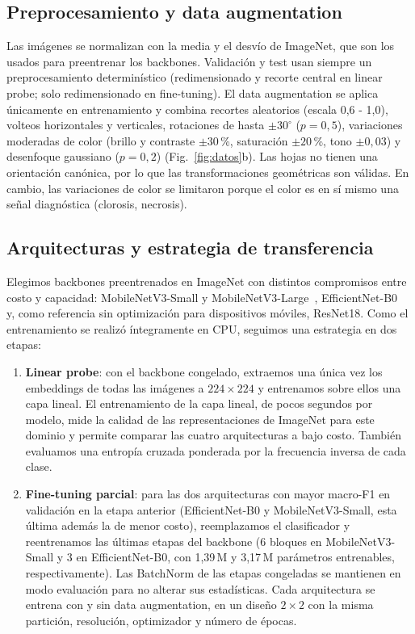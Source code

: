 \subsection{Preprocesamiento y data augmentation}
\label{subsec:augmentation}
Las imágenes se normalizan con la media y el desvío de ImageNet, que son los usados para
preentrenar los backbones. Validación y test usan siempre un preprocesamiento determinístico
(redimensionado y recorte central en linear probe; solo redimensionado en fine-tuning). El data augmentation se aplica únicamente en entrenamiento y combina
recortes aleatorios (escala 0,6 - 1,0), volteos horizontales y verticales, rotaciones de hasta
$\pm30^\circ$ ($p=0{,}5$), variaciones moderadas de color (brillo y contraste $\pm30$\,\%,
saturación $\pm20$\,\%, tono $\pm0{,}03$) y desenfoque gaussiano ($p=0{,}2$)
(Fig.~\ref{fig:datos}b). Las hojas no
tienen una orientación canónica, por lo que las transformaciones geométricas son válidas. En
cambio, las variaciones de color se limitaron porque el color es en sí mismo una señal
diagnóstica (clorosis, necrosis).

\subsection{Arquitecturas y estrategia de transferencia}
\label{subsec:arquitecturas}
Elegimos backbones preentrenados en ImageNet con distintos compromisos entre costo y
capacidad: MobileNetV3-Small y MobileNetV3-Large~\cite{howard2019searching},
EfficientNet-B0~\cite{tan2019efficientnet} y, como referencia sin optimización para
dispositivos móviles, ResNet18. Como el entrenamiento se realizó íntegramente en CPU, seguimos
una estrategia en dos etapas:
\begin{enumerate}
  \item \textbf{Linear probe}: con el backbone congelado, extraemos una única vez los
        embeddings de todas las imágenes a $224\times224$ y entrenamos sobre ellos una capa
        lineal. El entrenamiento de la capa lineal, de pocos segundos por modelo, mide la calidad de las
        representaciones de ImageNet para este dominio y permite comparar las cuatro
        arquitecturas a bajo costo. También evaluamos una entropía cruzada ponderada por la
        frecuencia inversa de cada clase.
  \item \textbf{Fine-tuning parcial}: para las dos arquitecturas con mayor macro-F1 en
        validación en la etapa anterior (EfficientNet-B0 y MobileNetV3-Small, esta última
        además la de menor costo), reemplazamos el clasificador y
        reentrenamos las últimas etapas del backbone (6 bloques en MobileNetV3-Small y 3 en
        EfficientNet-B0, con 1,39\,M y 3,17\,M parámetros entrenables, respectivamente). Las
        BatchNorm de las etapas congeladas se mantienen en modo evaluación para no alterar sus
        estadísticas. Cada arquitectura se entrena con y sin data augmentation, en un diseño
        $2\times2$ con la misma partición, resolución, optimizador y número de épocas.
\end{enumerate}

